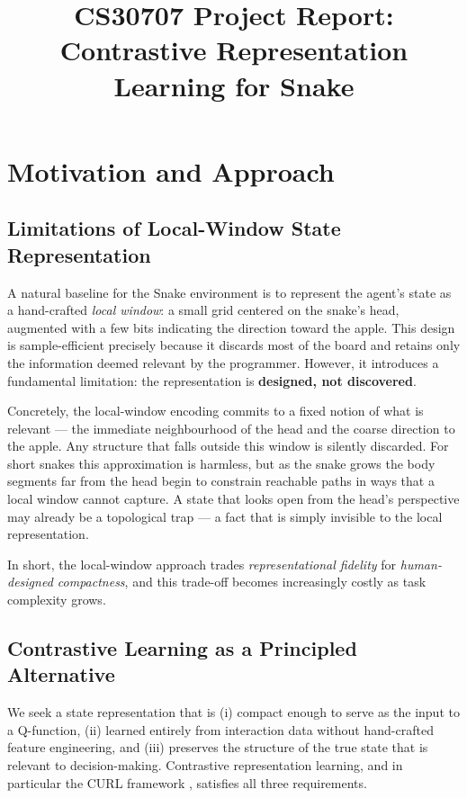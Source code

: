\documentclass[11pt]{article}
\title{CS30707 Project Report:\\
Contrastive Representation Learning for Snake}
\author{}
\date{}
\begin{document}
\maketitle

\section{Motivation and Approach}

\subsection{Limitations of Local-Window State Representation}

A natural baseline for the Snake environment is to represent the agent's
state as a hand-crafted \emph{local window}: a small grid centered on the
snake's head, augmented with a few bits indicating the direction toward the
apple.
This design is sample-efficient precisely because it discards most of the
board and retains only the information deemed relevant by the programmer.
However, it introduces a fundamental limitation: the representation is
\textbf{designed, not discovered}.

Concretely, the local-window encoding commits to a fixed notion of what is
relevant — the immediate neighbourhood of the head and the coarse direction
to the apple.
Any structure that falls outside this window is silently discarded.
For short snakes this approximation is harmless, but as the snake grows the
body segments far from the head begin to constrain reachable paths in ways
that a local window cannot capture.
A state that looks open from the head's perspective may already be a
topological trap — a fact that is simply invisible to the local representation.

In short, the local-window approach trades \emph{representational fidelity}
for \emph{human-designed compactness}, and this trade-off becomes increasingly
costly as task complexity grows.

\subsection{Contrastive Learning as a Principled Alternative}

We seek a state representation that is (i) compact enough to serve as the
input to a Q-function, (ii) learned entirely from interaction data without
hand-crafted feature engineering, and (iii) preserves the structure of the
true state that is relevant to decision-making.
Contrastive representation learning, and in particular the CURL framework
\cite{curl2020}, satisfies all three requirements.
\end{document}
